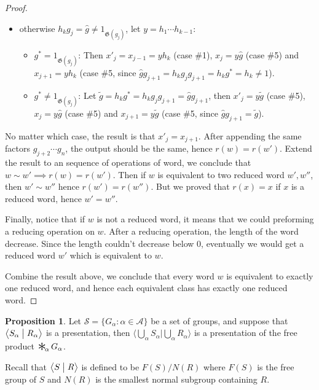 \documentclass[a4paper,titlepage]{article}
\theoremstyle{remark}
\theoremstyle{definition}
\theoremstyle{theorem}
\newtheorem{proposition}{Proposition}
\DeclareMathOperator*{\freeprod}{\raisebox{-0.4ex}{\scalebox{2}{$\ast$}}\!}
\newcommand{\gid}{\mathfrak{G}}
\begin{document}
\begin{proof}
\begin{itemize}
      \item otherwise $h_k g_j = \hat{g} \neq 1_{\gid(g_j)}$, let $y = h_1 \cdots h_{k-1}$:
        \begin{itemize}
          \item $g^* = 1_{\gid(g_j)}$: Then $x'_j = x_{j-1} = y h_k$ (case \#1), 
            $x_j = y \hat{g}$ (case \#5) and
            $x_{j+1} = y h_k$ (case \#5, since $\hat{g} g_{j+1} = h_k g_j g_{j+1} = h_k g^* = h_k \neq 1$). 
          \item $g^* \neq 1_{\gid(g_j)}$: Let $\tilde{g} = h_k g^* = h_k g_j g_{j+1} = \hat{g} g_{j+1}$, 
            then $x'_j = y \tilde{g}$ (case \#5), 
            $x_j = y \hat{g}$ (case \#5) and
            $x_{j+1} = y \tilde{g}$ (case \#5, since $\hat{g} g_{j+1} = \tilde{g}$). 
      \end{itemize}
    \end{itemize}
    No matter which case, the result is that $x'_j = x_{j+1}$.
    After appending the same factors $g_{j+2} \cdots g_n$, the output should be the same, hence
    $r(w) = r(w')$. Extend the result to an sequence of operations of word, we conclude that
    $w \sim w' \implies r(w) = r(w')$. Then if $w$ is equivalent to two reduced word $w', w''$,
    then $w' \sim w''$ hence $r(w') = r(w'')$. But we proved that $r(x) = x$ if $x$ is a reduced word,
    hence $w' = w''$.

    Finally, notice that if $w$ is not a reduced word, it means that we could preforming a reducing
    operation on $w$. After a reducing operation, the length of the word decrease. Since the length
    couldn't decrease below $0$, eventually we would get a reduced word $w'$ which is equivalent to
    $w$.
    
    Combine the result above, we conclude that every word $w$ is equivalent to exactly one reduced
    word, and hence each equivalent class has exactly one reduced word.
  \end{proof}

  \begin{proposition}
    Let $\mathcal{S} = \{ G_\alpha : \alpha \in \mathcal{A} \}$ be a set of groups, and suppose that
    $\big\langle S_\alpha \bigm| R_\alpha \big\rangle$ is a presentation, then 
    $\Big\langle \bigcup\limits_\alpha S_\alpha \mathrel{\Big|} \bigcup\limits_\alpha R_\alpha \Big\rangle$
    is a presentation of the free product $\freeprod_\alpha G_\alpha$.
  \end{proposition}

  Recall that $\big\langle S \bigm| R \big\rangle$ is defined to be $F(S) / N(R)$ where $F(S)$ is
  the free group of $S$ and $N(R)$ is the smallest normal subgroup containing $R$.
\end{document}
